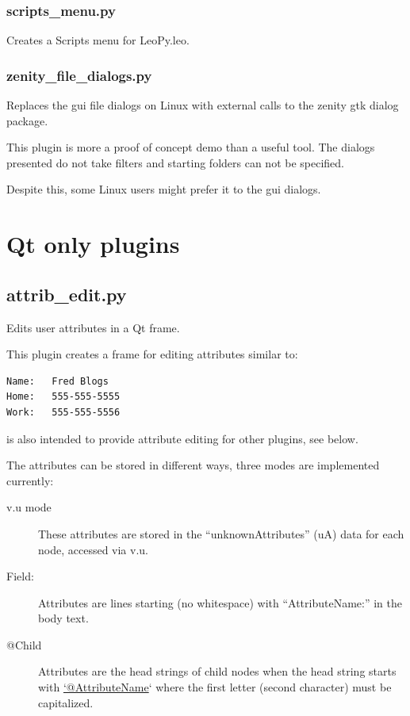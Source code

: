 \documentclass[a4paper,10pt,english]{sphinxmanual}
\begin{document}
\subsubsection{scripts\_menu.py}
\label{plugins:scripts-menu-py}
Creates a Scripts menu for LeoPy.leo.


\subsubsection{zenity\_file\_dialogs.py}
\label{plugins:zenity-file-dialogs-py}
Replaces the gui file dialogs on Linux with external
calls to the zenity gtk dialog package.

This plugin is more a proof of concept demo than
a useful tool.  The dialogs presented do not take
filters and starting folders can not be specified.

Despite this, some Linux users might prefer it to the
gui dialogs.


\section{Qt only plugins}
\label{plugins:qt-only-plugins}

\subsection{attrib\_edit.py}
\label{plugins:attrib-edit-py}
Edits user attributes in a Qt frame.

This plugin creates a frame for editing attributes similar to:

\begin{Verbatim}[commandchars=\\\{\}]
Name:   Fred Blogs
Home:   555-555-5555
Work:   555-555-5556
\end{Verbatim}

 is also intended to provide attribute editing for
other plugins, see below.

The attributes can be stored in different ways, three modes are implemented
currently:
\begin{description}
\item[{v.u mode}] \leavevmode
These attributes are stored in the ``unknownAttributes'' (uA) data for
each node, accessed via v.u.

\item[{Field:}] \leavevmode
Attributes are lines starting (no whitespace) with ``AttributeName:'' in
the body text.

\item[{@Child}] \leavevmode
Attributes are the head strings of child nodes when the head string
starts with \href{mailto:'@AttributeName}{`@AttributeName}` where the first letter (second character)
must be capitalized.

\end{description}
\end{document}
